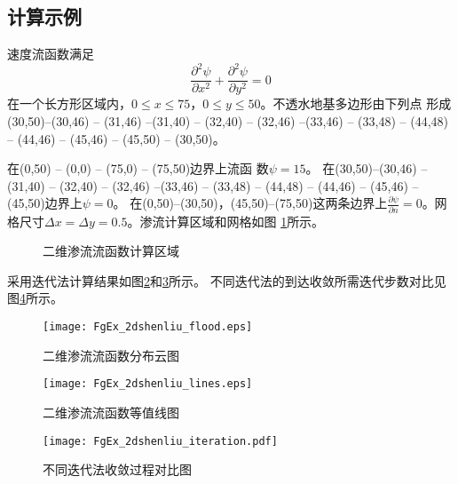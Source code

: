 \subsection{计算示例}
速度流函数满足
\begin{equation}
  \frac{\partial^{2}\psi }{\partial x^{2}} +
  \frac{\partial^{2}\psi }{\partial y^{2}} =
  0
\end{equation}
在一个长方形区域内，$0 \le x \le 75$，$0 \le y \le 50$。不透水地基多边形由下列点
形成(30,50)--(30,46) -- (31,46)
--(31,40) -- (32,40) -- (32,46) --(33,46) -- (33,48) -- (44,48) -- (44,46) --
(45,46) -- (45,50) -- (30,50)。 

在(0,50) -- (0,0) -- (75,0) -- (75,50)边界上流函
数$\psi=15$。
在(30,50)--(30,46)
--(31,40) -- (32,40) -- (32,46) --(33,46) -- (33,48) -- (44,48) -- (44,46) --
(45,46) -- (45,50)边界上$\psi=0$。
在(0,50)--(30,50)，(45,50)--(75,50)这两条边界上$\frac{\partial\psi }{\partial n}
=0$。网格尺寸$\Delta x=\Delta y=0.5$。渗流计算区域和网格如图
\ref{fig_2dshenliu_region}所示。
\begin{figure}[htb]
  \centering
  \caption{二维渗流流函数计算区域}
  \label{fig_2dshenliu_region}
\end{figure}

采用迭代法计算结果如图\ref{FgEx_2dshenliu_flood}和\ref{FgEx_2dshenliu_lines}所示。
不同迭代法的到达收敛所需迭代步数对比见图\ref{FgEx_2dshenliu_iteration}所示。
\begin{figure}[htb]
  \centering
  \texttt{[image: FgEx\_2dshenliu\_flood.eps]}
  \caption{二维渗流流函数分布云图}
  \label{FgEx_2dshenliu_flood}
\end{figure}
\begin{figure}[htb]
  \centering
  \texttt{[image: FgEx\_2dshenliu\_lines.eps]}
  \caption{二维渗流流函数等值线图}
  \label{FgEx_2dshenliu_lines}
\end{figure}
\begin{figure}[htb]
  \centering
  \texttt{[image: FgEx\_2dshenliu\_iteration.pdf]}
  \caption{不同迭代法收敛过程对比图}
  \label{FgEx_2dshenliu_iteration}
\end{figure}

